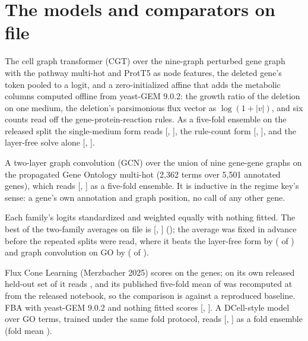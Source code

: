 
\clearpage
\section{The models and comparators on file}
\label{sec:models}

 The cell graph transformer (CGT) over the nine-graph
perturbed gene graph with the pathway multi-hot and ProtT5 as node features, the deleted
gene's token pooled to a logit, and a zero-initialized affine that adds the metabolic
columns computed offline from yeast-GEM 9.0.2: the growth ratio of the deletion on one
medium, the deletion's parsimonious flux vector as $\log(1 + |v|)$, and six counts read
off the gene-protein-reaction rules. As a five-fold ensemble on the released split the
single-medium form reads \gfamoneMedium{} [\gfamoneMediumLo{}, \gfamoneMediumHi{}], the
rule-count form \gfamruleCounts{} [\gfamruleCountsLo{}, \gfamruleCountsHi{}], and the
layer-free solve alone \gfamlayerFree{} [\gfamlayerFreeLo{}, \gfamlayerFreeHi{}].

 A two-layer graph convolution (GCN) over the union
of nine gene-gene graphs on the propagated Gene Ontology multi-hot (2,362 terms over
5,501 annotated genes), which reads \gfamgoGcn{} [\gfamgoGcnLo{}, \gfamgoGcnHi{}] as a
five-fold ensemble. It is inductive in the regime key's sense: a gene's own annotation
and graph position, no call of any other gene.

 Each family's logits standardized and weighted equally with nothing
fitted. The best of the \gnPairAverages{} two-family averages on file is
\gbestAverage{} [\gbestAverageLo{}, \gbestAverageHi{}] (\gbestAverageNames{}); the average
was fixed in advance before the \gnResplits{} repeated splits were read, where it beats
the layer-free form by \gresplitDiffaverageMinuslayerfree{}
(\gresplitDiffaverageMinuslayerfreeUp{} of \gresplitDiffaverageMinuslayerfreeOf{}) and
graph convolution on GO by \gresplitDiffaverageMinusGOconvolution{}
(\gresplitDiffaverageMinusGOconvolutionUp{} of \gresplitDiffaverageMinusGOconvolutionOf{}).

 Flux Cone Learning (Merzbacher 2025) scores
\gfclAuroc{} on the \gnHeldOut{} genes; on its own released held-out set of
\gfclReleasedN{} it reads \gfclReleasedAuroc{}, and its published five-fold mean of
\gfclPublishedCv{} was recomputed at \gfclRecomputedCv{} from the released notebook, so the
comparison is against a reproduced baseline. FBA with yeast-GEM 9.0.2 and nothing fitted
scores \gfbaAuroc{} [\gfbaAurocLo{}, \gfbaAurocHi{}]. A DCell-style model over
\gdcellTerms{} GO terms, trained under the same fold protocol, reads \gdcellEnsemble{}
[\gdcellEnsembleLo{}, \gdcellEnsembleHi{}] as a fold ensemble (fold mean
\gdcellFoldMean{}).

